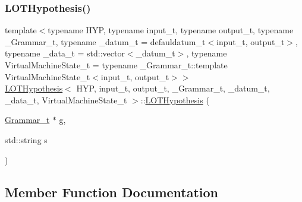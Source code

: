 \mbox{\label{class_l_o_t_hypothesis_a9361067f4f283bc21f77eee178965b39}} 
\subsubsection{\texorpdfstring{L\+O\+T\+Hypothesis()}{LOTHypothesis()}\hspace{0.1cm}{\footnotesize\ttfamily [4/4]}}
{\footnotesize\ttfamily template$<$typename H\+YP, typename input\+\_\+t, typename output\+\_\+t, typename \+\_\+\+Grammar\+\_\+t, typename \+\_\+datum\+\_\+t = defauldatum\+\_\+t$<$input\+\_\+t, output\+\_\+t$>$, typename \+\_\+data\+\_\+t = std\+::vector$<$\+\_\+datum\+\_\+t$>$, typename Virtual\+Machine\+State\+\_\+t = typename \+\_\+\+Grammar\+\_\+t\+::template Virtual\+Machine\+State\+\_\+t$<$input\+\_\+t, output\+\_\+t$>$$>$ \\
\hyperlink{class_l_o_t_hypothesis}{L\+O\+T\+Hypothesis}$<$ H\+YP, input\+\_\+t, output\+\_\+t, \+\_\+\+Grammar\+\_\+t, \+\_\+datum\+\_\+t, \+\_\+data\+\_\+t, Virtual\+Machine\+State\+\_\+t $>$\+::\hyperlink{class_l_o_t_hypothesis}{L\+O\+T\+Hypothesis} (\begin{DoxyParamCaption}\item[{\hyperlink{class_l_o_t_hypothesis_a8006204013d471860e54c49d19edbace}{Grammar\+\_\+t} $\ast$}]{g,  }\item[{std\+::string}]{s }\end{DoxyParamCaption})\hspace{0.3cm}{\ttfamily [inline]}}



\subsection{Member Function Documentation}
\mbox{\label{class_l_o_t_hypothesis_a9f528a8b204b87cc6fcf8d81c8c2b036}} 
